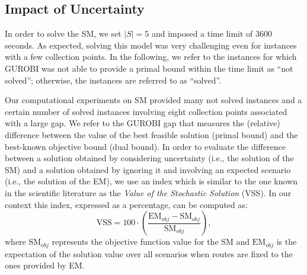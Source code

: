\documentclass[preprint,11pt,authoryear]{elsarticle}
\begin{document}
\subsection{Impact of Uncertainty}\label{SSA}
In order to solve the SM, we set $|S|=5$ and imposed a time limit of 3600 seconds. As expected, solving this model was very challenging even for instances with a few collection points. In the following, we refer to the instances for which GUROBI was not able to provide a primal bound within the time limit as ``not solved''; otherwise, the instances are referred to as ``solved''.

Our computational experiments on SM provided many not solved instances and a certain number of solved instances involving eight collection points associated with a large gap. 
We refer to the GUROBI gap that measures the (relative) difference between the value of the best feasible solution (primal bound) and the best-known objective bound (dual bound). In order to evaluate the difference between a solution obtained by considering uncertainty (i.e., the solution of the SM) and a solution obtained by ignoring it and involving an expected scenario (i.e., the solution of the EM), we use an index which is similar to the one known in the scientific literature as the \textit{Value of the Stochastic Solution} (VSS). In our context this index, expressed as a percentage, can be computed as:
\begin{equation}\label{VSS}
 \text{VSS} = 100 \cdot \left( \frac{\text{EM}_{obj} - \text{SM}_{obj}}{\text{SM}_{obj}} \right),
\end{equation}
where $\text{SM}_{obj}$ represents the objective function value for the SM and $\text{EM}_{obj}$ is the expectation of the solution value over all scenarios when routes are fixed to the ones provided by EM.\\ 
\end{document}
